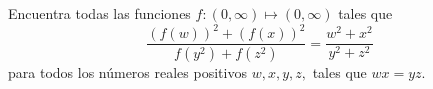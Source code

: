 Encuentra todas las funciones $ f: (0, \infty) \mapsto (0, \infty)$ tales que 
\[ \frac {\left( f(w) \right)^2 + \left( f(x) \right)^2}{f(y^2) + f(z^2) } = \frac {w^2 + x^2}{y^2 + z^2} \]
para todos los números reales positivos $ w,x,y,z,$ tales que $ wx = yz.$
